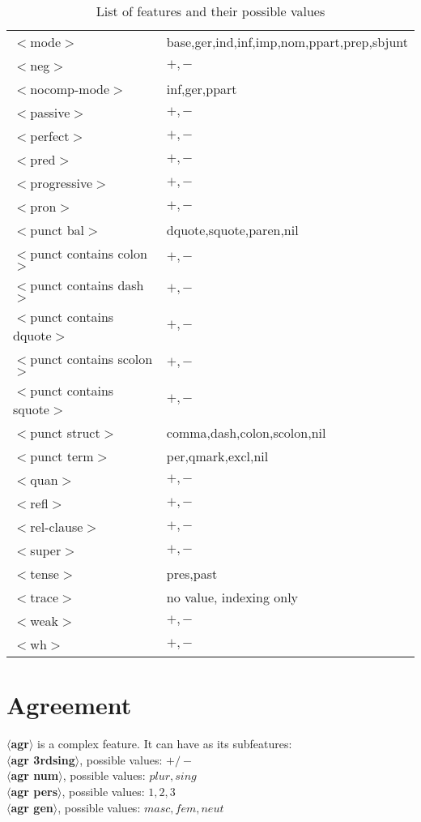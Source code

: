 \begin{table}[htbp]
\begin{tabular}{|l|l|}
$<$mode$>$&base,ger,ind,inf,imp,nom,ppart,prep,sbjunt\\
$<$neg$>$&$+,-$\\
$<$nocomp-mode$>$&inf,ger,ppart\\
$<$passive$>$&$+,-$\\
$<$perfect$>$&$+,-$\\
$<$pred$>$&$+,-$\\
$<$progressive$>$&$+,-$\\
$<$pron$>$&$+,-$\\
$<$punct bal$>$&dquote,squote,paren,nil\\
$<$punct contains colon$>$&$+,-$\\
$<$punct contains dash$>$&$+,-$\\
$<$punct contains dquote$>$&$+,-$\\
$<$punct contains scolon$>$&$+,-$\\
$<$punct contains squote$>$&$+,-$\\
$<$punct struct$>$&comma,dash,colon,scolon,nil\\
$<$punct term$>$&per,qmark,excl,nil\\
$<$quan$>$&$+,-$\\
$<$refl$>$&$+,-$\\
$<$rel-clause$>$&$+,-$\\
$<$super$>$&$+,-$\\
$<$tense$>$&pres,past\\
$<$trace$>$&no value, indexing only\\
$<$weak$>$&$+,-$\\
$<$wh$>$&$+,-$\\
\hline
\end{tabular}
\caption{List of features and their possible values}
\label{feature-table}
\end{table}

\normalsize


\section{Agreement}
{\bf $\langle$agr$\rangle$} is a complex feature.
It can have as its subfeatures:\\
{\bf $\langle$agr 3rdsing$\rangle$}, possible values: {\bf $+/-$ }\\
{\bf $\langle$agr num$\rangle$}, possible values: {\bf $plur,sing$ }\\
{\bf $\langle$agr pers$\rangle$}, possible values: {\bf $1,2,3$ }\\
{\bf $\langle$agr gen$\rangle$}, possible values: {\bf $masc,fem,neut$ }

